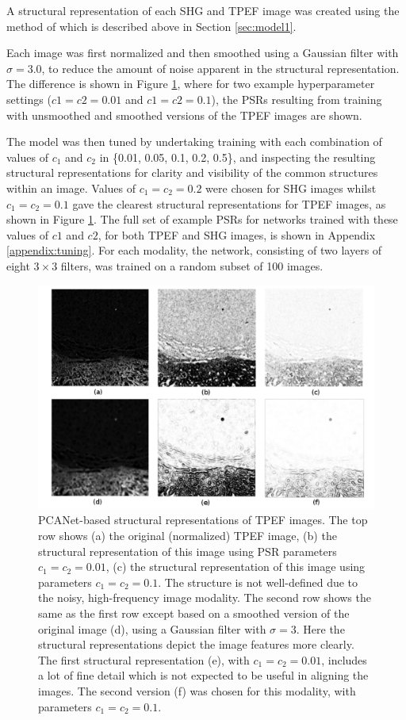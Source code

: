 \documentclass{report}
\begin{document}
A structural representation of each SHG and TPEF image was created using the method of \cite{zhu2018pcanet} which is described above in Section \ref{sec:model1}.

Each image was first normalized and then smoothed using a Gaussian filter with $\sigma=3.0$, to reduce the amount of noise apparent in the structural representation. The difference is shown in Figure \ref{fig:tuningPSR}, where for two example hyperparameter settings ($c1=c2=0.01$ and $c1=c2=0.1$), the PSRs resulting from training with unsmoothed and smoothed versions of the TPEF images are shown. 

The model was then tuned by undertaking training with each combination of values of $c_1$ and $c_2$ in \{0.01, 0.05, 0.1, 0.2, 0.5\}, and inspecting the resulting structural representations for clarity and visibility of the common structures within an image.
Values of $c_1=c_2=0.2$ were chosen for SHG images whilst $c_1=c_2=0.1$ gave the clearest structural representations for TPEF images, as shown in Figure \ref{fig:tuningPSR}. The full set of example PSRs for networks trained with these values of $c1$ and $c2$, for both TPEF and SHG images, is shown in Appendix \ref{appendix:tuning}. For each modality, the network, consisting of two layers of eight $3 \times 3$ filters, was trained on a random subset of 100 images.

\begin{figure}
\centering
\includegraphics[width=5.75in]{tuning_tpef_148185_11.pdf}
\caption{PCANet-based structural representations of TPEF images. The top row shows (a) the original (normalized) TPEF image, (b) the structural representation of this image using PSR parameters $c_1=c_2=0.01$, (c) the structural representation of this image using parameters $c_1=c_2=0.1$. The structure is not well-defined due to the noisy, high-frequency image modality. The second row shows the same as the first row except based on a smoothed version of the original image (d), using a Gaussian filter with $\sigma=3$. Here the structural representations depict the image features more clearly. The first structural representation (e), with $c_1=c_2=0.01$, includes a lot of fine detail which is not expected to be useful in aligning the images. The second version (f) was chosen for this modality, with parameters $c_1=c_2=0.1$.}
\label{fig:tuningPSR}
\end{figure}
\end{document}
